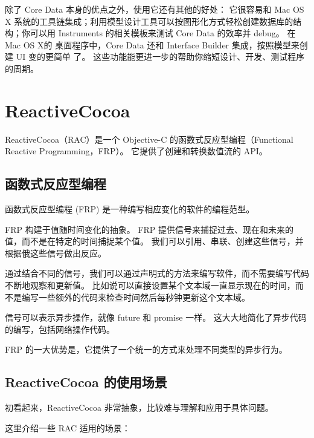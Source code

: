 除了 Core Data 本身的优点之外，使用它还有其他的好处： 它很容易和 Mac OS X 系统的工具链集成；利用模型设计工具可以按图形化方式轻松创建数据库的结构；你可以用 Instruments 的相关模板来测试 Core Data 的效率并 debug。 在 Mac OS X的 桌面程序中，Core Data 还和 Interface Builder 集成，按照模型来创建 UI 变的更简单 了。 这些功能能更进一步的帮助你缩短设计、开发、测试程序的周期。

\section{ReactiveCocoa}

ReactiveCocoa（RAC）是一个 Objective-C 的函数式反应型编程（Functional Reactive Programming，FRP）。
它提供了创建和转换数值流的 API。

\subsection{函数式反应型编程}
函数式反应型编程 (FRP) 是一种编写相应变化的软件的编程范型。

FRP 构建于值随时间变化的抽象。
FRP 提供信号来捕捉过去、现在和未来的值，而不是在特定的时间捕捉某个值。
我们可以引用、串联、创建这些信号，并根据俄这些信号做出反应。

通过结合不同的信号，我们可以通过声明式的方法来编写软件，而不需要编写代码不断地观察和更新值。
比如说可以直接设置某个文本域一直显示现在的时间，而不是编写一些额外的代码来检查时间然后每秒钟更新这个文本域。

信号可以表示异步操作，就像 future 和 promise 一样。
这大大地简化了异步代码的编写，包括网络操作代码。

FRP 的一大优势是，它提供了一个统一的方式来处理不同类型的异步行为。

\subsection{ReactiveCocoa 的使用场景}

初看起来，ReactiveCocoa 非常抽象，比较难与理解和应用于具体问题。

这里介绍一些 RAC 适用的场景：

